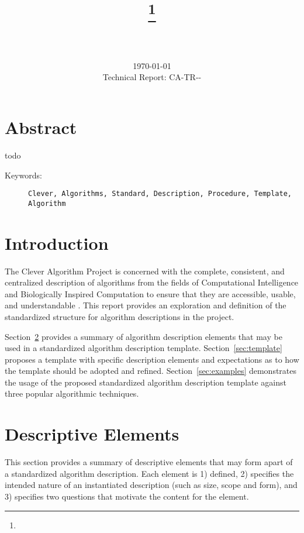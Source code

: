 \documentclass[a4paper, 11pt]{article}
\title{{\myreporttitle}\footnote{\myreportlicense}}
\author{\myreportauthor\\{\myreportemail}\\\small\myreportproject}
\date{\today\\{\small{Technical Report: CA-TR-{\myreportdate}-\myreportversion}}}
\begin{document}
\maketitle

\section*{Abstract} 
todo

\begin{description}
	\item[Keywords:] {\small\texttt{Clever, Algorithms, Standard, Description, Procedure, Template, Algorithm}}
\end{description} 

\section{Introduction}
\label{sec:introduction}
The Clever Algorithm Project is concerned with the complete, consistent, and centralized description of algorithms from the fields of Computational Intelligence and Biologically Inspired Computation to ensure that they are accessible, usable, and understandable \cite{Brownlee2010}.
This report provides an exploration and definition of the standardized structure for algorithm descriptions in the project.

Section~\ref{sec:elements} provides a summary of algorithm description elements that may be used in a standardized algorithm description template. Section~\ref{sec:template} proposes a template with specific description elements and expectations as to how the template should be adopted and refined. Section~\ref{sec:examples} demonstrates the usage of the proposed standardized algorithm description template against three popular algorithmic techniques.

\section{Descriptive Elements}
\label{sec:elements}
This section provides a summary of descriptive elements that may form apart of a standardized algorithm description. Each element is 1) defined, 2) specifies the intended nature of an instantiated description (such as size, scope and form), and 3) specifies two questions that motivate the content for the element.
\end{document}
